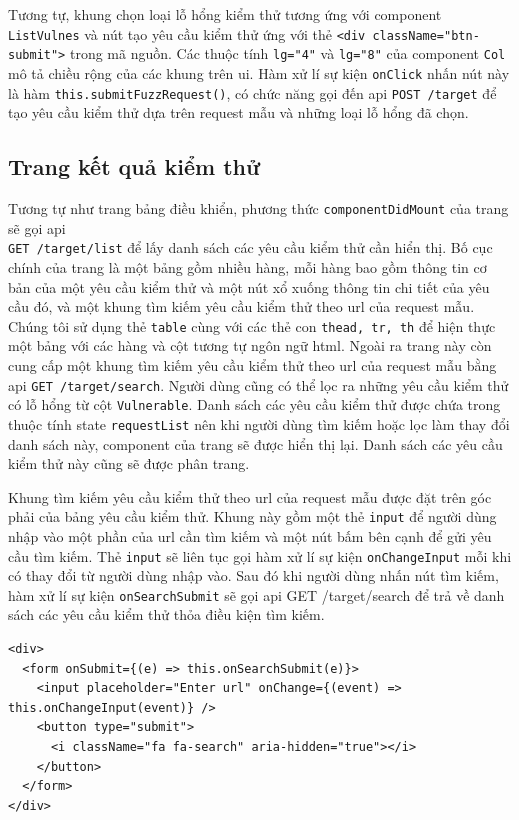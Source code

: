 \FloatBarrier
Tương tự, khung chọn loại lỗ hổng kiểm thử tương ứng với component \texttt{ListVulnes} và nút tạo yêu cầu kiểm thử ứng với thẻ \texttt{<div className="btn-submit">} trong mã nguồn. Các thuộc tính \texttt{lg="4"} và \texttt{lg="8"} của component \texttt{Col} mô tả chiều rộng của các khung trên \acrshort{ui}. Hàm xử lí sự kiện \texttt{onClick} nhấn nút này là hàm \texttt{this.submitFuzzRequest()}, có chức năng gọi đến \acrshort{api} \colorbox{gray!30}{\texttt{POST /target}} để tạo yêu cầu kiểm thử dựa trên request mẫu và những loại lỗ hổng đã chọn.
\subsection{Trang kết quả kiểm thử}
Tương tự như trang bảng điều khiển, phương thức \texttt{componentDidMount} của trang sẽ gọi \acrshort{api}\\\colorbox{gray!30}{\texttt{GET /target/list}} để lấy danh sách các yêu cầu kiểm thử cần hiển thị. Bố cục chính của trang là một bảng gồm nhiều hàng, mỗi hàng bao gồm thông tin cơ bản của một yêu cầu kiểm thử và một nút xổ xuống thông tin chi tiết của yêu cầu đó, và một khung tìm kiếm yêu cầu kiểm thử theo \acrshort{url} của request mẫu. Chúng tôi sử dụng thẻ \texttt{table} cùng với các thẻ con \texttt{thead, tr, th} để hiện thực một bảng với các hàng và cột tương tự ngôn ngữ \acrshort{html}. Ngoài ra trang này còn cung cấp một khung tìm kiếm yêu cầu kiểm thử theo \acrshort{url} của request mẫu bằng \acrshort{api} \colorbox{gray!30}{\texttt{GET /target/search}}. Người dùng cũng có thể lọc ra những yêu cầu kiểm thử có lỗ hổng từ cột \texttt{Vulnerable}. Danh sách các yêu cầu kiểm thử được chứa trong thuộc tính state \texttt{requestList} nên khi người dùng tìm kiếm hoặc lọc làm thay đổi danh sách này, component của trang sẽ được hiển thị lại. Danh sách các yêu cầu kiểm thử này cũng sẽ được phân trang.\par
Khung tìm kiếm yêu cầu kiểm thử theo \acrshort{url} của request mẫu được đặt trên góc phải của bảng yêu cầu kiểm thử. Khung này gồm một thẻ \texttt{input} để người dùng nhập vào một phần của \acrshort{url} cần tìm kiếm và một nút bấm bên cạnh để gửi yêu cầu tìm kiếm. Thẻ \texttt{input} sẽ liên tục gọi hàm xử lí sự kiện \texttt{onChangeInput} mỗi khi có thay đổi từ người dùng nhập vào. Sau đó khi người dùng nhấn nút tìm kiếm, hàm xử lí sự kiện \texttt{onSearchSubmit} sẽ gọi \acrshort{api} \colorbox{gray!30}{GET /target/search} để trả về danh sách các yêu cầu kiểm thử thỏa điều kiện tìm kiếm.
\begin{lstlisting}[style=ES6, label={lst:implement-search-bar}, caption={Hiện thực khung tìm kiếm yêu cầu kiểm thử theo \acrshort{url}}]
<div>
  <form onSubmit={(e) => this.onSearchSubmit(e)}>
    <input placeholder="Enter url" onChange={(event) => this.onChangeInput(event)} />
    <button type="submit">
      <i className="fa fa-search" aria-hidden="true"></i>
    </button>
  </form>
</div>
\end{lstlisting}
